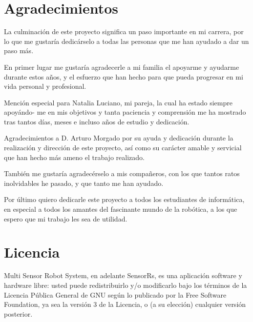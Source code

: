 

\section{Agradecimientos}
\label{sec:agradecimientos}

La culminación de este proyecto significa un paso importante en mi carrera, por lo que me gustaría dedicárselo a todas las personas que me han ayudado a dar un paso más.\bigskip

En primer lugar me gustaría agradecerle a mi familia el apoyarme y ayudarme durante estos años,
y el esfuerzo que han hecho para que pueda progresar en mi vida personal y profesional.\bigskip


Mención especial para Natalia Luciano, mi pareja, la cual ha estado siempre apoyándo-
me en mis objetivos y tanta paciencia y comprensión me ha mostrado tras tantos días,
meses e incluso años de estudio y dedicación.\bigskip

Agradecimientos a D. Arturo Morgado por su ayuda y dedicación durante la realización y dirección de este proyecto, así como su carácter amable y servicial que han hecho más ameno el trabajo realizado.\bigskip

También me gustaría agradecérselo a mis compañeros, con los que tantos ratos inolvidables he pasado, y que tanto me han ayudado.\bigskip

Por último quiero dedicarle este proyecto a todos los estudiantes de informática, en especial a todos los amantes del fascinante mundo de la robótica, a los que espero que mi trabajo les sea de utilidad.

\cleardoublepage

\section{Licencia}
\label{sec:licencia}

\bigskip
\bigskip

Multi Sensor Robot System, en adelante SensorRs, es una aplicación software y hardware libre: usted puede redistribuirlo y/o modificarlo bajo los términos de la Licencia Pública General de GNU según lo publicado por la Free Software Foundation, ya sea la versión 3 
de la Licencia, o (a su elección) cualquier versión posterior.\\

